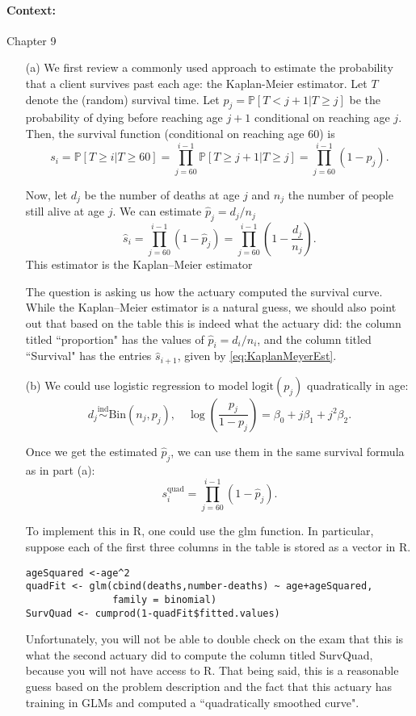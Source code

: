 \paragraph{Context:} \citet{efron2016computer} Chapter 9
\begin{itemize}
\item[(a)] We first review a commonly used approach to estimate the probability that a client survives past each age: the Kaplan-Meier estimator.
Let $T$ denote the (random) survival time. Let $p_j = \mathbb P[T < j+1|T \geq j]$ be the probability of dying before reaching age $j+1$ conditional on reaching age $j$. Then, the survival function (conditional on reaching age 60) is 
\begin{equation*} s_i = \mathbb P[T \geq i|T \geq 60] = \prod_{j = 60}^{i-1} \mathbb P[T \geq j+1|T \geq j] = \prod_{j = 60}^{i-1} (1-p_j).
\end{equation*}

Now, let $d_j$ be the number of deaths at age $j$ and $n_j$ the number of people still alive at age $j$. We can estimate $\hat p_j = d_j/n_j$
\begin{equation} 
\hat s_i = \prod_{j = 60}^{i-1} (1-\hat p_j) = \prod_{j = 60}^{i-1} \left(1-\frac{d_j}{n_j}\right).
\label{eq:KaplanMeyerEst}
\end{equation}
This estimator is the Kaplan--Meier estimator

The question is asking us how the actuary computed the survival curve. While the Kaplan--Meier estimator is a natural guess, we should also point out that based on the table this is indeed what the actuary did: the column titled ``proportion" has the values of  $\hat p_i = d_i/n_i$, and the column titled ``Survival" has the entries $\hat s_{i+1}$, given by \eqref{eq:KaplanMeyerEst}.

\item[(b)] We could use logistic regression to model $\text{logit}(p_j)$ quadratically in age:
\[d_j \overset{\text{ind}}\sim \text{Bin}(n_j, p_j), \quad \log\left(\frac{p_j}{1-p_j}\right) = \beta_0 + j\beta_1 + j^2\beta_2.\]

Once we get the estimated $\hat{p}_j$, we can use them in the same survival formula as in part (a): 
\[s^{\text{quad}}_i = \prod_{j=60}^{i-1}(1-\hat{p}_j).\]

To implement this in R, one could use the glm function. In particular, suppose each of the first three columns in the table is stored as a vector in R.
\begin{verbatim}
ageSquared <-age^2
quadFit <- glm(cbind(deaths,number-deaths) ~ age+ageSquared, 
			   family = binomial)
SurvQuad <- cumprod(1-quadFit$fitted.values)
\end{verbatim}

Unfortunately, you will not be able to double check on the exam that this is what the second actuary did to compute the column titled SurvQuad, because you will not have access to R. That being said, this is a reasonable guess based on the problem description and the fact that this actuary has training in GLMs and computed a ``quadratically smoothed curve". 
\end{itemize}


